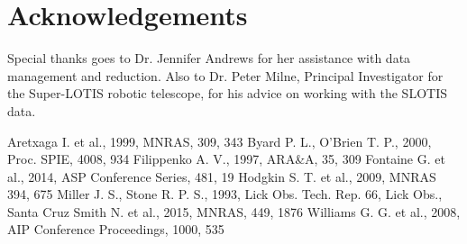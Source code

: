 \documentclass[iop]{emulateapj}
\begin{document}
\section{Acknowledgements}
Special thanks goes to Dr. Jennifer Andrews for her assistance with data management and reduction. Also to Dr. Peter Milne, Principal Investigator for the Super-LOTIS robotic telescope, for his advice on working with the SLOTIS data.

\begin{thebibliography}{}
 Aretxaga I. et al., 1999, MNRAS, 309, 343
 Byard P. L., O'Brien T. P., 2000, Proc. SPIE, 4008, 934
 Filippenko A. V., 1997, ARA\&A, 35, 309
 Fontaine G. et al., 2014, ASP Conference Series, 481, 19
 Hodgkin S. T. et al., 2009, MNRAS 394, 675
 Miller J. S., Stone R. P. S., 1993, Lick Obs. Tech. Rep. 66, Lick Obs., Santa Cruz
 Smith N. et al., 2015, MNRAS, 449, 1876
 Williams G. G. et al., 2008, AIP Conference Proceedings, 1000, 535
\end{thebibliography}
\end{document}
